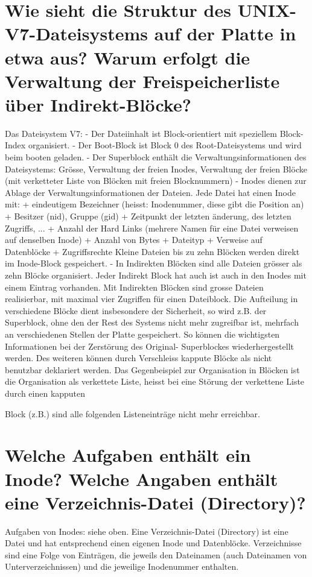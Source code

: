 \documentclass[12pt,a4paper,ngerman]{scrartcl}
\newcommand{\question}[1]{#1}
\newenvironment {answer}
                {}
                {}
\begin{document}
\section{\question{Wie sieht die Struktur des UNIX-V7-Dateisystems auf der Platte in etwa aus? Warum erfolgt die Verwaltung der Freispeicherliste über Indirekt-Blöcke?}}
\begin{answer}
Das Dateisystem V7:
- Der Dateiinhalt ist Block-orientiert mit speziellem Block-Index organisiert.
- Der Boot-Block ist Block 0 des Root-Dateisystems und wird beim booten geladen.
- Der Superblock enthält die Verwaltungsinformationen des Dateisystems: Grösse, Verwaltung der
freien Inodes, Verwaltung der freien Blöcke (mit verketteter Liste von Blöcken mit freien Blocknummern)
- Inodes dienen zur Ablage der Verwaltungsinformationen der Dateien. Jede Datei hat einen Inode
mit:
+ eindeutigem Bezeichner (heisst: Inodenummer, diese gibt die Position an)
+ Besitzer (nid), Gruppe (gid)
+ Zeitpunkt der letzten änderung, des letzten Zugriffs, ...
+ Anzahl der Hard Links (mehrere Namen für eine Datei verweisen auf denselben Inode)
+ Anzahl von Bytes
+ Dateityp
+ Verweise auf Datenblöcke
+ Zugriffsrechte
Kleine Dateien bis zu zehn Blöcken werden direkt im Inode-Block gespeichert.
- In Indirekten Blöcken sind alle Dateien grösser als zehn Blöcke organisiert. Jeder Indirekt Block
hat auch ist auch in den Inodes mit einem Eintrag vorhanden. Mit Indirekten Blöcken sind grosse
Dateien realisierbar, mit maximal vier Zugriffen für einen Dateiblock.
Die Aufteilung in verschiedene Blöcke dient insbesondere der Sicherheit, so wird z.B. der Superblock,
ohne den der Rest des Systems nicht mehr zugreifbar ist, mehrfach an verschiedenen Stellen
der Platte gespeichert. So können die wichtigsten Informationen bei der Zerstörung des Original-
Superblockes wiederhergestellt werden. Des weiteren können durch Verschleiss kappute Blöcke als
nicht benutzbar deklariert werden. Das Gegenbeispiel zur Organisation in Blöcken ist die Organisation
als verkettete Liste, heisst bei eine Störung der verkettene Liste durch einen kapputen

Block (z.B.) sind alle folgenden Listeneinträge nicht mehr erreichbar.
\end{answer}

\section{\question{Welche Aufgaben enthält ein Inode? Welche Angaben enthält eine Verzeichnis-Datei (Directory)?}}
\begin{answer}
Aufgaben von Inodes: siehe oben. Eine Verzeichnis-Datei (Directory) ist eine Datei und hat entsprechend
einen eigenen Inode und Datenblöcke. Verzeichnisse sind eine Folge von Einträgen, die
jeweils den Dateinamen (auch Dateinamen von Unterverzeichnissen) und die jeweilige Inodenummer
enthalten.
\end{answer}
\end{document}
